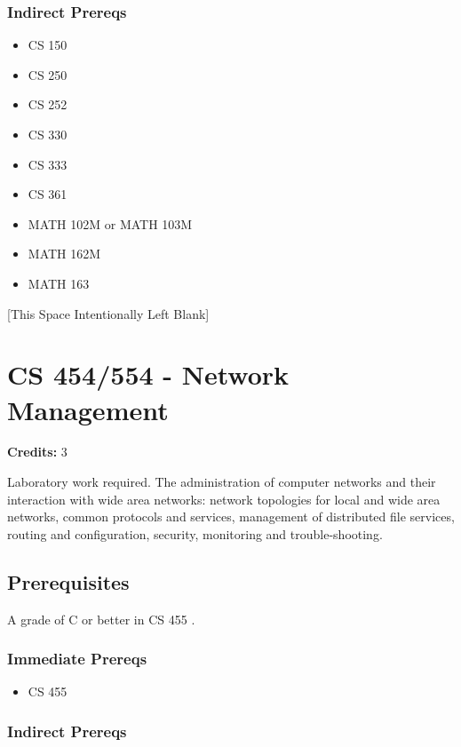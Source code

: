 \documentclass[]{article}
\providecommand{\tightlist}{%
  \setlength{\itemsep}{0pt}\setlength{\parskip}{0pt}}
\newcommand{\pagebreakhere}{
\vspace*{\fill}
\begin{center}
[This Space Intentionally Left Blank]
\end{center}
\vspace*{\fill}
\newpage
}
\begin{document}
\subsubsection{Indirect Prereqs}\label{indirect-prereqs-26}

\begin{itemize}
\tightlist
\item
  CS 150
\item
  CS 250
\item
  CS 252
\item
  CS 330
\item
  CS 333
\item
  CS 361
\item
  MATH 102M or MATH 103M
\item
  MATH 162M
\item
  MATH 163
\end{itemize}

\pagebreakhere
\section{CS 454/554 - Network
Management}\label{cs-454554---network-management}

\textbf{Credits:} 3

Laboratory work required. The administration of computer networks and
their interaction with wide area networks: network topologies for local
and wide area networks, common protocols and services, management of
distributed file services, routing and configuration, security,
monitoring and trouble-shooting.

\subsection{Prerequisites}\label{prerequisites-35}

A grade of C or better in CS 455 .

\subsubsection{Immediate Prereqs}\label{immediate-prereqs-27}

\begin{itemize}
\tightlist
\item
  CS 455
\end{itemize}

\subsubsection{Indirect Prereqs}\label{indirect-prereqs-27}
\end{document}
